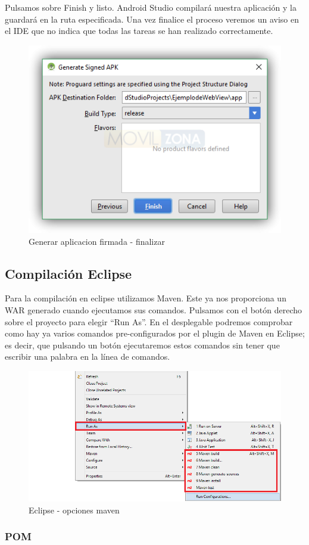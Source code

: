 Pulsamos sobre Finish y listo. Android Studio compilará nuestra aplicación y la guardará en la ruta especificada. Una vez finalice el proceso veremos un aviso en el IDE que no indica que todas las tareas se han realizado correctamente.

\begin{figure}[H]
	\centering
	\includegraphics[width=0.6\linewidth]{figuras/build-5}
	\caption{Generar aplicacion firmada - finalizar}
	\label{fig:bld2}
\end{figure}

\subsection{Compilación Eclipse}

Para la compilación en eclipse utilizamos Maven. Este ya nos proporciona un WAR generado cuando ejecutamos sus comandos. Pulsamos con el botón derecho sobre el proyecto para elegir “Run As”. En el desplegable podremos comprobar como hay ya varios comandos pre-configurados por el plugin de Maven en Eclipse; es decir, que pulsando un botón ejecutaremos estos comandos sin tener que escribir una palabra en la línea de comandos.

\begin{figure}[H]
	\centering
	\includegraphics[width=0.5\linewidth]{figuras/maven/maven1}
	\caption{Eclipse - opciones maven}
	\label{fig:mvn1}
\end{figure}

\subsubsection{POM}


